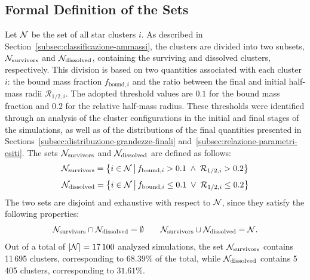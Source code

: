\subsection{Formal Definition of the Sets}
\label{subsec:criterio-vivi-morti}
Let $\mathcal{N}$ be the set of all star clusters $i$. As described in Section~\ref{subsec:classificazione-ammassi}, the clusters are divided into two subsets, $\mathcal{N}_{\mathrm{survivors}}$ and $\mathcal{N}_{\mathrm{dissolved}}$, containing the surviving and dissolved clusters, respectively. This division is based on two quantities associated with each cluster $i$: the bound mass fraction $f_{\mathrm{bound}, i}$ and the ratio between the final and initial half-mass radii $\mathcal{R}_{1/2, i}$. The adopted threshold values are $0.1$ for the bound mass fraction and $0.2$ for the relative half-mass radius. These thresholds were identified through an analysis of the cluster configurations in the initial and final stages of the simulations, as well as of the distributions of the final quantities presented in Sections~\ref{subsec:distribuzione-grandezze-finali} and~\ref{subsec:relazione-parametri-esiti}.
The sets $\mathcal{N}_{\mathrm{survivors}}$ and $\mathcal{N}_{\mathrm{dissolved}}$ are defined as follows:
\[
\mathcal{N}_{\mathrm{survivors}} = \left\{ i \in \mathcal{N} \,\middle|\, f_{\mathrm{bound}, i} > 0.1 \;\land\; \mathcal{R}_{1/2, i} > 0.2 \right\}
\]
\[
\mathcal{N}_{\mathrm{dissolved}} = \left\{ i \in \mathcal{N} \,\middle|\, f_{\mathrm{bound}, i} \leq 0.1 \;\lor\; \mathcal{R}_{1/2, i} \leq 0.2 \right\}
\]
The two sets are disjoint and exhaustive with respect to $\mathcal{N}$, since they satisfy the following properties:
\[
\mathcal{N}_{\mathrm{survivors}} \cap \mathcal{N}_{\mathrm{dissolved}} = \emptyset
\qquad
\mathcal{N}_{\mathrm{survivors}} \cup \mathcal{N}_{\mathrm{dissolved}} = \mathcal{N}.
\]
Out of a total of $|\mathcal{N}|=17\,100$ analyzed simulations, the set $\mathcal{N}_{\mathrm{survivors}}$ contains 11\,695 clusters, corresponding to $68.39\%$ of the total, while $\mathcal{N}_{\mathrm{dissolved}}$ contains 5\,405 clusters, corresponding to $31.61\%$.
